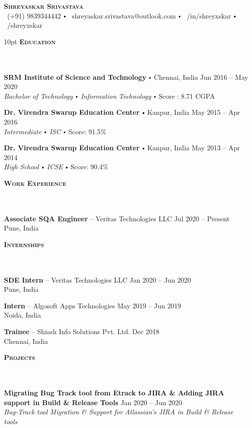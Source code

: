 \documentclass{article}
\newcommand{\contact}[3]{
\vspace*{5pt}
\begin{center}
{\LARGE \scshape {#1}}\\
\vspace{3pt}
#2 
\vspace{2pt}
#3
\end{center}
\vspace*{-8pt}
}
\newcommand{\header}[1]{{
\hspace*{-15pt}\vspace*{6pt} \textsc{#1}} \vspace*{-6pt} 
\lineunder
}
\newcommand{\lineunder}{
\vspace*{-8pt} \\ \hspace*{-18pt} 
\hrulefill \\
}
\newcommand{\school}[4]{
\textbf{#1} \labelitemi #2 \hfill #3 \\ #4 \vspace*{5pt}
}
\newcommand{\employer}[4]{{
\vspace*{2pt}%
\textbf{#1} #2 \hfill #3\\ #4 \vspace*{2pt}}
}
\newcommand{\project}[4]{{
\vspace*{2pt}%
\textbf{#1} #2 \hfill #3\\ \textit{#4} \vspace*{2pt}}
}
\renewcommand{\labelitemi}{
$\vcenter{\hbox{\tiny$\bullet$}}$\hspace*{3pt}
}
\renewcommand{\labelitemii}{
$\vcenter{\hbox{\tiny$\bullet$}}$\hspace*{-3pt}
}
\newenvironment{bullet-list-minor}{
\begin{list}{\labelitemii}{\setlength\leftmargin{15pt} 
\topsep 0pt \itemsep -2pt}}{\vspace*{4pt}\end{list}
}
\begin{document}
\small
\smallskip
\vspace*{-30pt}
\contact{\textbf{Shreyaskar Srivastava}}
{\faPhone\ (+91) 9839344442  \labelitemi \faEnvelope\ shreyaskar.srivastava@outlook.com  \labelitemi \faLinkedin\ /in/shreyxskar  \labelitemi \faGithub\ /shreyxskar}

\vspace{10pt}
\header{\textbf{Education}}
    \school{SRM Institute of Science and Technology}{Chennai, India}{Jun 2016 -- May 2020}
    {\textit{Bachelor of Technology \labelitemi Information Technology}\labelitemi Score : 8.71 CGPA}

    \school{Dr. Virendra Swarup Education Center}{Kanpur, India}{May 2015 -- Apr 2016}
    {\textit{Intermediate \labelitemi ISC}\labelitemi Score: 91.5\%}
    
    \school{Dr. Virendra Swarup Education Center}{Kanpur, India}{May 2013 -- Apr 2014}
    {\textit{High School \labelitemi ICSE}\labelitemi Score: 90.4\%}


\vspace*{6pt}%
\header{\textbf{Work Experience}}
    \employer{Associate SQA Engineer}{-- Veritas Technologies LLC}{Jul 2020 -- Present}{Pune, India}


\vspace*{6pt}%
\header{\textbf{Internships}}
    \employer{SDE Intern}{-- Veritas Technologies LLC}{Jan 2020 -- Jun 2020}{Pune, India}

    \employer{Intern}{-- Algosoft Apps Technologies}{May 2019 -- Jun 2019}{Noida, India}

    \employer{Trainee}{-- Shiash Info Solutions Pvt. Ltd.}{Dec 2018 }{Chennai, India}

\vspace*{6pt}%
\header{\textbf{Projects}}
    \project{Migrating Bug Track tool from Etrack to JIRA {\&} Adding\newline
    JIRA support in Build {\&} Release Tools}{ }{ Jan 2020 -- Jun 2020}{Bug-Track tool Migration {\&} Support for Atlassian's JIRA in Build {\&} Release tools}
    
\end{document}
